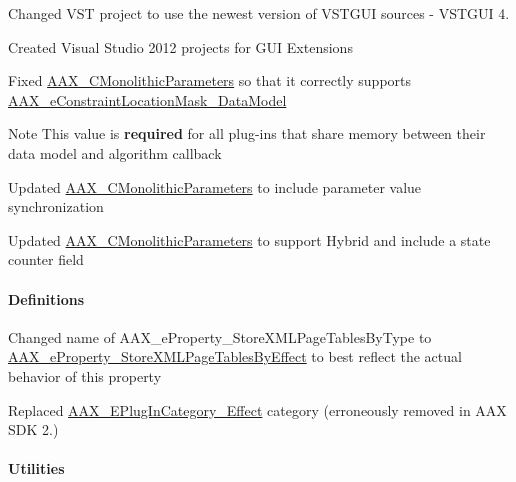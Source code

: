 \begin{DoxyItemize}
\item Changed V\+ST project to use the newest version of V\+S\+T\+G\+UI sources -\/ V\+S\+T\+G\+UI 4. 
\item Created Visual Studio 2012 projects for G\+UI Extensions 
\item Fixed \mbox{\hyperlink{a01969}{A\+A\+X\+\_\+\+C\+Monolithic\+Parameters}} so that it correctly supports \mbox{\hyperlink{a00491_a0c5d795c1fd021c5b9b541febc34601aa027df08c137702400a92719828bea44b}{A\+A\+X\+\_\+e\+Constraint\+Location\+Mask\+\_\+\+Data\+Model}} \begin{DoxyNote}{Note}
This value is {\bfseries{required}} for all plug-\/ins that share memory between their data model and algorithm callback  
\end{DoxyNote}

\item Updated \mbox{\hyperlink{a01969}{A\+A\+X\+\_\+\+C\+Monolithic\+Parameters}} to include parameter value synchronization 
\item Updated \mbox{\hyperlink{a01969}{A\+A\+X\+\_\+\+C\+Monolithic\+Parameters}} to support Hybrid and include a state counter field 
\end{DoxyItemize}\hypertarget{a00847_aax_sdk_2p2p0_Definitions}{}\paragraph{Definitions}\label{a00847_aax_sdk_2p2p0_Definitions}

\begin{DoxyItemize}
\item Changed name of {\ttfamily A\+A\+X\+\_\+e\+Property\+\_\+\+Store\+X\+M\+L\+Page\+Tables\+By\+Type} to \mbox{\hyperlink{a00662_a13e384f22825afd3db6d68395b79ce0da1837e77c3a427004ac44714a8c9cbad9}{A\+A\+X\+\_\+e\+Property\+\_\+\+Store\+X\+M\+L\+Page\+Tables\+By\+Effect}} to best reflect the actual behavior of this property 
\item Replaced \mbox{\hyperlink{a00491_aef9637518fb1ac0e2f403444c73aba4aa207547a1e08d751a54a02e4ad368a277}{A\+A\+X\+\_\+\+E\+Plug\+In\+Category\+\_\+\+Effect}} category (erroneously removed in A\+AX S\+DK 2.) 
\end{DoxyItemize}\hypertarget{a00847_aax_sdk_2p2p0_Utilities}{}\paragraph{Utilities}\label{a00847_aax_sdk_2p2p0_Utilities}

